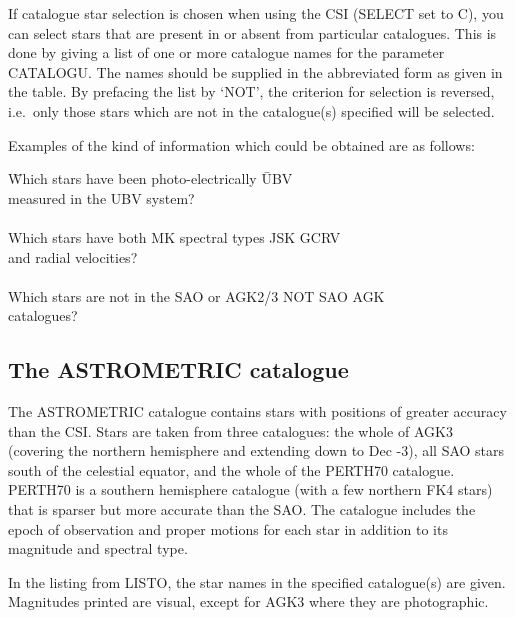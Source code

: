 If catalogue star selection is chosen when using the CSI (SELECT set to C),
you can select stars that are present in or absent from particular catalogues.
This is done by giving a list of one or more catalogue names for the parameter
CATALOGU.
The names should be supplied in the abbreviated form as given in the table.
By prefacing the list by `NOT', the criterion for selection is reversed,
i.e.\ only those stars which are not in the catalogue(s) specified will be
selected.

Examples of the kind of information which could be obtained are as follows:

\begin{tabbing}
\hspace{10mm}\=Which stars have been photo-electrically \hspace{10mm}\=UBV\\
\>measured in the UBV system?\\ \\

\>Which stars have both MK spectral types \>JSK GCRV \\
\>and radial velocities? \\ \\

\>Which stars are not in the SAO or AGK2/3 \>NOT SAO AGK \\
\>catalogues?
\end{tabbing}

\subsection{The ASTROMETRIC catalogue}
The ASTROMETRIC catalogue contains stars with positions of greater accuracy than
the CSI.
Stars are taken from three catalogues:
the whole of AGK3 (covering the northern hemisphere and extending down to Dec
-3), all SAO stars south of the celestial equator, and the whole of the PERTH70
catalogue.
PERTH70 is a southern hemisphere catalogue (with a few northern FK4 stars) that
is sparser but more accurate than the SAO.
The catalogue includes the epoch of observation and proper motions for each star
in addition to its magnitude and spectral type.

In the listing from LISTO, the star names in the specified catalogue(s) are
given.
Magnitudes printed are visual, except for AGK3 where they are photographic.
